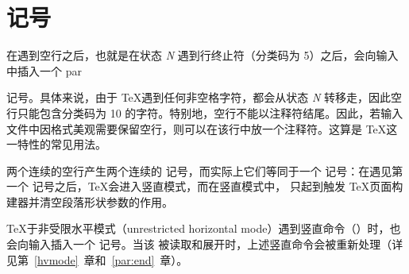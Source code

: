 \documentclass{book}
\begin{document}
\def\cspar{\cs{par}}
\section{\n{\protect\cspar} 记号}

在遇到空行之后，也就是在状态 {\itshape N} 遇到行终止符（分类码为 5）之后，会向输入中插入一个 \csterm par\par 记号。具体来说，由于 \TeX 遇到任何非空格字符，都会从状态 {\itshape N} 转移走，因此空行只能包含分类码为 10 的字符。特别地，空行不能以注释符结尾。因此，若输入文件中因格式美观需要保留空行，则可以在该行中放一个注释符。这算是 \TeX 这一特性的常见用法。

两个连续的空行产生两个连续的  记号，而实际上它们等同于一个  记号：在遇见第一个  记号之后，\TeX 会进入竖直模式，而在竖直模式中， 只起到触发 \TeX 页面构建器并清空段落形状参数的作用。

\TeX 于非受限水平模式（unrestricted horizontal mode）遇到竖直命令（）时，也会向输入插入一个  记号。当该  被读取和展开时，上述竖直命令会被重新处理（详见第~\ref{hvmode}~章和~\ref{par:end}~章）。
\end{document}
